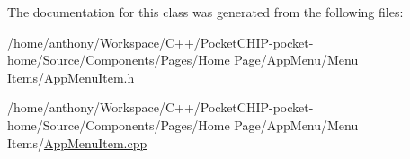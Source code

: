 The documentation for this class was generated from the following files\+:\begin{DoxyCompactItemize}
\item 
/home/anthony/\+Workspace/\+C++/\+Pocket\+C\+H\+I\+P-\/pocket-\/home/\+Source/\+Components/\+Pages/\+Home Page/\+App\+Menu/\+Menu Items/\mbox{\hyperlink{AppMenuItem_8h}{App\+Menu\+Item.\+h}}\item 
/home/anthony/\+Workspace/\+C++/\+Pocket\+C\+H\+I\+P-\/pocket-\/home/\+Source/\+Components/\+Pages/\+Home Page/\+App\+Menu/\+Menu Items/\mbox{\hyperlink{AppMenuItem_8cpp}{App\+Menu\+Item.\+cpp}}\end{DoxyCompactItemize}
